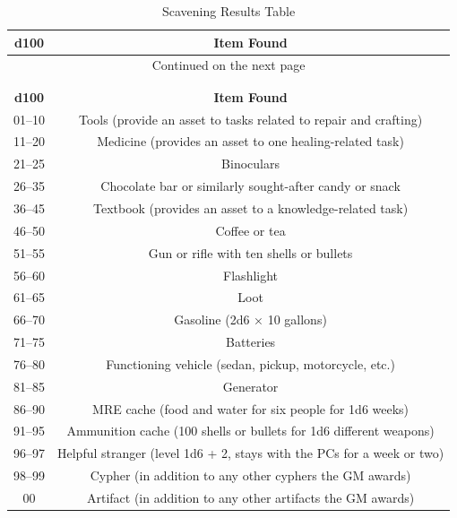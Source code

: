 \begin{longtable}{|c|c|}
\caption{Scavening Results Table} \label{tab:Scavening Results Table}\\
\hline
\textbf{d100} & \textbf{Item Found} \\
\hline
\endhead

\multicolumn{2}{|c|}{Continued on the next page} \\ \hline
\endfoot

\multicolumn{2}{|c|}{End of table} \\ \hline
\endlastfoot

\multicolumn{2}{|c|}{\textbf{Useful Stuff}} \\ \hline
\textbf{d100} & \textbf{Item Found} \\ \hline
01–10 & Tools (provide an asset to tasks related to repair and crafting) \\ \hline
11–20 & Medicine (provides an asset to one healing-related task) \\ \hline
21–25 & Binoculars \\ \hline
26–35 & Chocolate bar or similarly sought-after candy or snack \\ \hline
36–45 & Textbook (provides an asset to a knowledge-related task) \\ \hline
46–50 & Coffee or tea  \\ \hline
51–55 & Gun or rifle with ten shells or bullets \\ \hline
56–60 & Flashlight \\ \hline
61–65 & Loot  \\ \hline
66–70 & Gasoline (2d6 × 10 gallons) \\ \hline
71–75 & Batteries \\ \hline
76–80 & Functioning vehicle (sedan, pickup, motorcycle, etc.) \\ \hline
81–85 & Generator  \\ \hline
86–90 & MRE cache (food and water for six people for 1d6 weeks) \\ \hline
91–95 & Ammunition cache (100 shells or bullets for 1d6 different weapons) \\ \hline
96–97 & Helpful stranger (level 1d6 + 2, stays with the PCs for a week or two) \\ \hline
98–99 & Cypher (in addition to any other cyphers the GM awards) \\ \hline
00 & Artifact (in addition to any other artifacts the GM awards) \\ \hline


\end{longtable}
